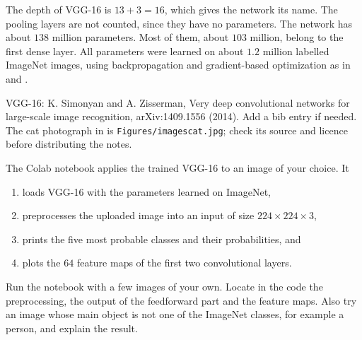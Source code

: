 The depth of VGG-16 is $13 + 3 = 16$, which gives the network its name. The pooling layers are not counted, since they have no parameters. The network has about $138$ million parameters. Most of them, about $103$ million, belong to the first dense layer. All parameters were learned on about $1.2$ million labelled ImageNet images, using backpropagation and gradient-based optimization as in  and .
\begin{autref}
VGG-16: K. Simonyan and A. Zisserman, Very deep convolutional networks for large-scale image recognition, arXiv:1409.1556 (2014). Add a bib entry if needed. The cat photograph in  is \texttt{Figures/imagescat.jpg}; check its source and licence before distributing the notes.
\end{autref}
\begin{code}
The Colab notebook
\href{https://drive.google.com/file/d/11ddy1PA-9L2SbUFrRdsuoSZqNwa0HePd/view?usp=sharing}{\texttt{\color{thc}{ImageClassificationVGG16}}}
applies the trained VGG-16 to an image of your choice. It
\begin{enumerate}
\item loads VGG-16 with the parameters learned on ImageNet,
\item preprocesses the uploaded image into an input of size $224\times224\times3$,
\item prints the five most probable classes and their probabilities, and
\item plots the $64$ feature maps of the first two convolutional layers.
\end{enumerate}
Run the notebook with a few images of your own. Locate in the code the preprocessing, the output of the feedforward part and the feature maps. Also try an image whose main object is not one of the ImageNet classes, for example a person, and explain the result.
\end{code}
